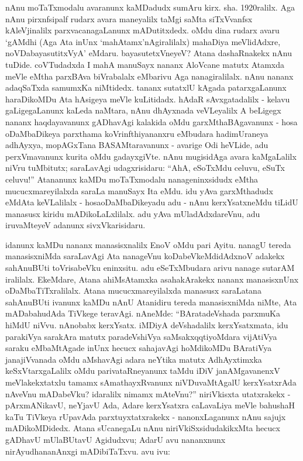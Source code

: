 nAnu moTaTxmodalu avaranunx kaMDadudx sumAru kirx. sha. {\rm 1920}ralilx. Aga nAnu pirxnfsipalf rudarx avara maneyalilx taMgi saMta siTxVvanfsx kAleVjinalilx parxvacanagaLanunx mADutitxdedx. oMdu dina rudarx avaru `gAMdhi (Aga Ata inUnx `mahAtamx'nAgiralilalx) mahaDiya meVlidAdxre, noVDabayasutitxVyA' eMdaru. bayasutetxVneyeV? Atana dashaRnakekx nAnu tuDide. coVTudadxda I mahA manuSayx nananx AloVcane matutx Atamxda meVle eMtha parxBAva biVrabalalx eMbarivu Aga nanagiralilalx. nAnu nananx adaqSaTxda samumxKa niMtidedx. tananx sutatxlU kAgada patarxgaLanunx haraDikoMDu Ata hAsigeya meVle kuLitidadx. hAdaR sAvxgatadalilx - kelavu gaLigegaLanunx kaLeda naMtara, nAnu dhAyxnada veVLeyalilx A beLigegx nananx haqdayavanunx gADhavAgi kalakida oMdu garxMthaBAgavanunx - hosa oDaMbaDikeya parxthama koVrinfthiyananxru eMbudara hadimUraneya adhAyxya, mopAGxTana BASAMtaravanunx - avarige Odi heVLide, adu perxVmavanunx kurita oMdu gadayxgiVte. nAnu mugisidAga avara kaMgaLalilx niVru tuMbitutx; saraLavAgi udagxrisidaru: ``AhA, eSoTxMdu celuvu, eSuTx celuvu!'' Atananunx kaMDu moTaTxmodalu nanageninxsidudx eMtha mucucxmareyilalxda saraLa manuSayx Ita eMdu. idu yAva garxMthadudx eMdAta keVLalilalx - hosaoDaMbaDikeyadu adu - nAnu kerxYsatxneMdu tiLidU manasusx kiridu mADikoLaLxlilalx. adu yAva mUladAdxdareVnu, adu iruvaMteyeV adanunx sivxVkarisidaru.

idanunx kaMDu nananx manasisxnalilx EnoV oMdu pari Ayitu. nanagU tereda manasisxniMda saraLavAgi Ata nanageVnu koDabeVkeMdidAdxnoV adakekx sahAnuBUti toVrisabeVku eninxsitu. adu eSeTxMbudara arivu nanage sutarAM iralilalx. EkeMdare, Atana ahiMsAtamxka asahakArakekx nananx manasisxnUnx oDaMbaTiTxralilalx. Atana mucucxmareyilalxda manasusx saraLatana sahAnuBUti ivanunx kaMDu nAnU Atanidiru tereda manasisxniMda niMte, Ata mADabahudAda TiVkege teravAgi. nAneMde: ``BAratadeVshada parxmuKa hiMdU niVvu. nAnobabx kerxYsatx. iMDiyA deVshadalilx kerxYsatxmata, idu parakiVya sarakAra matutx paradeVshiVya saMsakxqqtiyoMdara vijAtiVya saraku eMbaMtAgade inUnx hecucx sahajavAgi hoMdikoMDu BAratiVya janajiVvanada oMdu aMshavAgi adara neYtika matutx AdhAyxtimxka keSxVtarxgaLalilx oMdu parivataRneyanunx taMdu iDiV janAMgavanenxV meVlakekxtatxlu tamamx sAmathayxRvanunx niVDuvaMtAgalU kerxYsatxrAda nAveVnu mADabeVku? idaralilx nimamx mAteVnu?'' niriVkisxta utatxrakekx - pArxmANikavU, neYjavU Ada, Adare kerxYsatxra caLavaLiya meVle bahushaH kaTu TiVkeya rUpavAda parxtuyxtatxrakekx - nanonxLaganunx nAnu sajujx mADikoMDidedx. Atana sUcanegaLu nAnu niriVkiSxsidudakikxMta hecucx gADhavU mUlaBUtavU Agidudxvu; AdarU avu nananxnunx nirAyudhananAnxgi mADibiTaTxvu. avu ivu:

